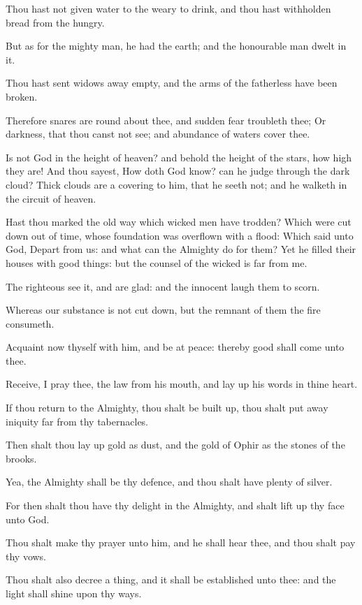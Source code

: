 \Verse Thou hast not given water to the weary to drink, and thou hast withholden bread from the hungry.

\Verse But as for the mighty man, he had the earth; and the honourable man dwelt in it.

\Verse Thou hast sent widows away empty, and the arms of the fatherless have been broken.

\Verse Therefore snares are round about thee, and sudden fear troubleth thee; \Verse Or darkness, that thou canst not see; and abundance of waters cover thee.

\Verse Is not God in the height of heaven? and behold the height of the stars, how high they are!  \Verse And thou sayest, How doth God know?  can he judge through the dark cloud?  \Verse Thick clouds are a covering to him, that he seeth not; and he walketh in the circuit of heaven.

\Verse Hast thou marked the old way which wicked men have trodden?  \Verse Which were cut down out of time, whose foundation was overflown with a flood: \Verse Which said unto God, Depart from us: and what can the Almighty do for them?  \Verse Yet he filled their houses with good things: but the counsel of the wicked is far from me.

\Verse The righteous see it, and are glad: and the innocent laugh them to scorn.

\Verse Whereas our substance is not cut down, but the remnant of them the fire consumeth.

\Verse Acquaint now thyself with him, and be at peace: thereby good shall come unto thee.

\Verse Receive, I pray thee, the law from his mouth, and lay up his words in thine heart.

\Verse If thou return to the Almighty, thou shalt be built up, thou shalt put away iniquity far from thy tabernacles.

\Verse Then shalt thou lay up gold as dust, and the gold of Ophir as the stones of the brooks.

\Verse Yea, the Almighty shall be thy defence, and thou shalt have plenty of silver.

\Verse For then shalt thou have thy delight in the Almighty, and shalt lift up thy face unto God.

\Verse Thou shalt make thy prayer unto him, and he shall hear thee, and thou shalt pay thy vows.

\Verse Thou shalt also decree a thing, and it shall be established unto thee: and the light shall shine upon thy ways.

